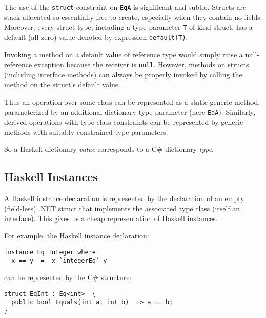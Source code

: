 \documentclass[preprint]{sig-alternate-05-2015}
\begin{document}
The use of the \lstinline{struct} constraint on \lstinline{EqA} is significant and subtle. Structs are stack-allocated so essentially free to create, especially when they contain no fields.
Moreover, every struct type, including a type parameter \lstinline{T} of kind struct, has a default (all-zero) value denoted by
 expression \lstinline{default(T)}.

Invoking a method on a default value of reference type would simply raise a null-reference exception because the receiver is \lstinline{null}.
However, methods on structs (including interface methods) can always be properly invoked
by calling the method on the struct's default value. 

Thus an operation over some class can be represented as a static generic method, 
parameterized by an additional dictionary type parameter (here \lstinline{EqA}).
Similarly, derived operations with type class constraints can be represented by generic methods with suitably constrained type parameters.

So a Haskell dictionary \emph{value} corresponds to a  C\# dictionary \emph{type}.




\subsection{Haskell Instances}

A Haskell instance declaration is represented by the declaration of an empty (field-less) .NET  struct that implements the associated type class (itself an interface).
This gives us a cheap representation of Haskell instances. 

For example, the Haskell instance declaration:
\begin{lstlisting}
instance Eq Integer where 
  x == y  =  x `integerEq` y
\end{lstlisting}

can be represented by the C\# structure:
\begin{lstlisting}
struct EqInt : Eq<int>  {
  public bool Equals(int a, int b)  => a == b;   
}
\end{lstlisting}
\end{document}
